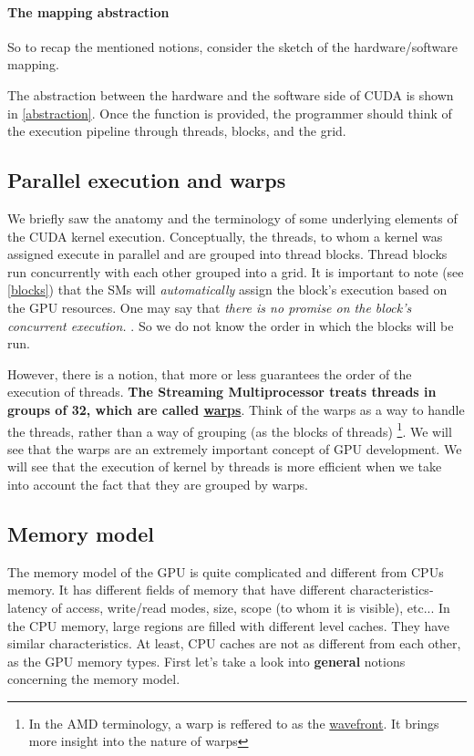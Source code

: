 \vspace{-18pt}
\paragraph{The mapping abstraction} So to recap the mentioned notions, consider the 
sketch of the hardware/software mapping.

The abstraction between the hardware and the software side of CUDA is shown in \autoref{abstraction}. Once the function 
is provided, the programmer should think of the execution pipeline through threads, blocks, and the grid.

\clearpage
\newpage
\subsection{Parallel execution and warps}
\label{warps}
We briefly saw the anatomy and the terminology of some underlying elements of the CUDA kernel execution.
Conceptually, the threads, to whom a kernel was assigned execute in parallel and are grouped into thread blocks.
Thread blocks run concurrently with each other grouped into a grid. It is important to note (see \autoref{blocks}) that 
the SMs will \textit{automatically} assign the block's execution based on the GPU resources. One may say that 
\textsl{
there is no promise on the block's concurrent execution.
}\cite{tuomanen2018hands}. So we do not know the order in which the blocks will be run.


However, there is a notion, that more or less guarantees the order of the execution of threads. 
\textbf{The Streaming Multiprocessor
treats threads in groups of 32, which are called \underline{warps}}. Think of the warps as a way to handle 
the threads, rather than 
a way of grouping (as the blocks of threads) \footnote{In the AMD terminology, a warp is reffered to as the 
\underline{wavefront}. It brings more insight into the nature of warps}.
We will see that the warps are an extremely important concept of GPU development. 
We will see that the execution of kernel by threads is more efficient when we take into account the fact that 
they are grouped by warps.

\subsection{Memory model}
The memory model of the GPU is quite complicated and different from CPUs memory. It has different fields of memory that have different characteristics-
latency of access, write/read modes, size, scope (to whom it is visible), etc... In the CPU memory, large regions are filled with different level caches. They have similar characteristics. At least, CPU caches are not as different from each other, as the GPU memory types.
First let's take a look into \textbf{general}
notions concerning the memory model.
\vspace{-15pt}
